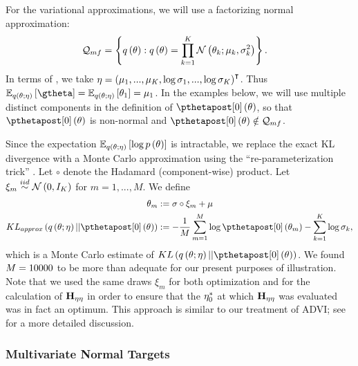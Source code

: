 \documentclass{article}\usepackage[]{graphicx}\usepackage[]{color}
\theoremstyle{definition}
\theoremstyle{plain}
\theoremstyle{plain}
\theoremstyle{plain}
\theoremstyle{definition}
\theoremstyle{plain}
\theoremstyle{plain}
\begin{document}
For the variational approximations, we will use a factorizing normal
approximation:
\begin{align*}
\mathcal{Q}_{mf} & =\left\{ q\left(\theta\right):q\left(\theta\right) =
    \prod_{k=1}^{K}\mathcal{N}\left(\theta_{k};
        \mu_{k},\sigma_{k}^{2}\right)\right\} .
\end{align*}
In terms of , we take
$\eta=\left(\mu_{1},...,\mu_{K},\log\sigma_{1},...,\log\sigma_{K}\right)^{\intercal}$.
Thus
$\mbe_{q\left(\theta;\eta\right)}\left[\gtheta\right]=\mbe_{q\left(\theta;\eta\right)}\left[\theta_{1}\right]=\mu_{1}$.
In the examples below, we will use multiple distinct components in the
definition of $\pzeropost\left(\theta\right)$, so that
$\pzeropost\left(\theta\right)$ is non-normal and
$\pzeropost\left(\theta\right)\notin\qsimple$.

Since the expectation $\mathbb{E}_{q\left(\theta;\eta\right)}\left[\log
p\left(\theta\right)\right]$ is intractable, we replace the exact KL divergence
with a Monte Carlo approximation using the ``re-parameterization trick''
\citep{kingma:2013:auto, rezende:2014:stochastic, titsias:2014:doubly}.
Let $\circ$ denote the Hadamard
(component-wise) product. Let $\xi_{m}\stackrel{iid}{\sim}\mathcal{N}\left(0,I_{K}\right)$ for
$m=1,...,M$. We define
\begin{align*}
\theta_{m} & :=\sigma\circ\xi_{m}+\mu\\
KL_{approx}\left(q\left(\theta;\eta\right)||\pzeropost\left(\theta\right)\right) & :=-\frac{1}{M}\sum_{m=1}^{M}\log\pzeropost\left(\theta_{m}\right)-\sum_{k=1}^{K}\log\sigma_{k},
\end{align*}
which is a Monte Carlo estimate of
$KL\left(q\left(\theta;\eta\right)||\pzeropost\left(\theta\right)\right)$.
We found $M=10000$ to be more than adequate for our present
purposes of illustration. Note that we used the same draws $\xi_{m}$ for both
optimization and for the calculation of $\mathbf{H}_{\eta\eta}$ in order to ensure that the
$\eta_{0}^{*}$ at which $\mathbf{H}_{\eta\eta}$ was evaluated was in fact an optimum. This
approach is similar to our treatment of ADVI;
see  for a more detailed discussion.

\subsubsection{Multivariate Normal Targets}
\end{document}
